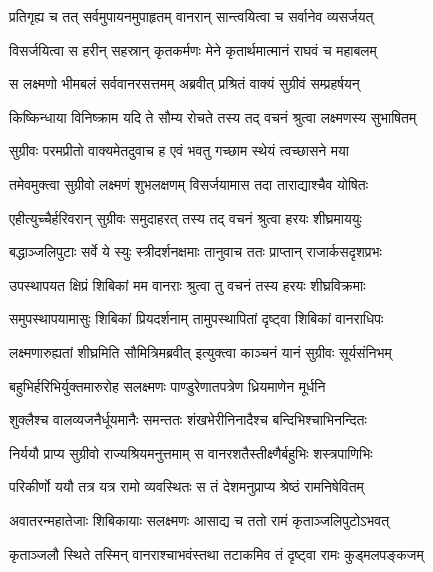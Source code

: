 
\twolineshloka
{प्रतिगृह्य च तत् सर्वमुपायनमुपाहृतम्}
{वानरान् सान्त्वयित्वा च सर्वानेव व्यसर्जयत्} %

\twolineshloka
{विसर्जयित्वा स हरीन् सहस्रान् कृतकर्मणः}
{मेने कृतार्थमात्मानं राघवं च महाबलम्} %

\twolineshloka
{स लक्ष्मणो भीमबलं सर्ववानरसत्तमम्}
{अब्रवीत् प्रश्रितं वाक्यं सुग्रीवं सम्प्रहर्षयन्} %

\twolineshloka
{किष्किन्धाया विनिष्क्राम यदि ते सौम्य रोचते}
{तस्य तद् वचनं श्रुत्वा लक्ष्मणस्य सुभाषितम्} %

\twolineshloka
{सुग्रीवः परमप्रीतो वाक्यमेतदुवाच ह}
{एवं भवतु गच्छाम स्थेयं त्वच्छासने मया} %

\twolineshloka
{तमेवमुक्त्वा सुग्रीवो लक्ष्मणं शुभलक्षणम्}
{विसर्जयामास तदा ताराद्याश्चैव योषितः} %

\twolineshloka
{एहीत्युच्चैर्हरिवरान् सुग्रीवः समुदाहरत्}
{तस्य तद् वचनं श्रुत्वा हरयः शीघ्रमाययुः} %

\twolineshloka
{बद्धाञ्जलिपुटाः सर्वे ये स्युः स्त्रीदर्शनक्षमाः}
{तानुवाच ततः प्राप्तान् राजार्कसदृशप्रभः} %

\twolineshloka
{उपस्थापयत क्षिप्रं शिबिकां मम वानराः}
{श्रुत्वा तु वचनं तस्य हरयः शीघ्रविक्रमाः} %

\twolineshloka
{समुपस्थापयामासुः शिबिकां प्रियदर्शनाम्}
{तामुपस्थापितां दृष्ट्वा शिबिकां वानराधिपः} %

\twolineshloka
{लक्ष्मणारुह्यतां शीघ्रमिति सौमित्रिमब्रवीत्}
{इत्युक्त्वा काञ्चनं यानं सुग्रीवः सूर्यसंनिभम्} %

\twolineshloka
{बहुभिर्हरिभिर्युक्तमारुरोह सलक्ष्मणः}
{पाण्डुरेणातपत्रेण ध्रियमाणेन मूर्धनि} %

\twolineshloka
{शुक्लैश्च वालव्यजनैर्धूयमानैः समन्ततः}
{शंखभेरीनिनादैश्च बन्दिभिश्चाभिनन्दितः} %

\twolineshloka
{निर्ययौ प्राप्य सुग्रीवो राज्यश्रियमनुत्तमाम्}
{स वानरशतैस्तीक्ष्णैर्बहुभिः शस्त्रपाणिभिः} %

\twolineshloka
{परिकीर्णो ययौ तत्र यत्र रामो व्यवस्थितः}
{स तं देशमनुप्राप्य श्रेष्ठं रामनिषेवितम्} %

\twolineshloka
{अवातरन्महातेजाः शिबिकायाः सलक्ष्मणः}
{आसाद्य च ततो रामं कृताञ्जलिपुटोऽभवत्} %

\twolineshloka
{कृताञ्जलौ स्थिते तस्मिन् वानराश्चाभवंस्तथा}
{तटाकमिव तं दृष्ट्वा रामः कुड्मलपङ्कजम्} %

